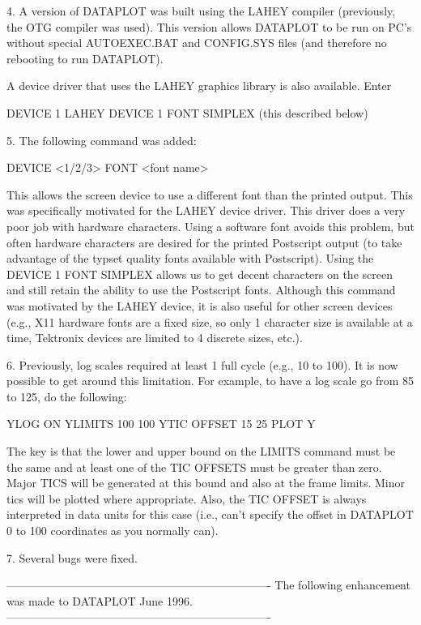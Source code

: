 { 4. A version of DATAPLOT was built using the LAHEY compiler
    (previously, the OTG compiler was used).  This version allows
    DATAPLOT to be run on PC's without special AUTOEXEC.BAT and
    CONFIG.SYS files (and therefore no rebooting to run DATAPLOT).

    A device driver that uses the LAHEY graphics library is also
    available.  Enter

        DEVICE 1 LAHEY
        DEVICE 1 FONT SIMPLEX    (this described below)

 5. The following command was added:

        DEVICE <1/2/3> FONT <font name>

    This allows the screen device to use a different font than the
    printed output.  This was specifically motivated for the LAHEY
    device driver.  This driver does a very poor job with hardware
    characters.  Using a software font avoids this problem, but
    often hardware characters are desired for the printed Postscript
    output (to take advantage of the typset quality fonts available
    with Postscript).  Using the DEVICE 1 FONT SIMPLEX allows us
    to get decent characters on the screen and still retain the
    ability to use the Postscript fonts.  Although this command
    was motivated by the LAHEY device, it is also useful for other
    screen devices (e.g., X11 hardware fonts are a fixed size, so
    only 1 character size is available at a time, Tektronix devices
    are limited to 4 discrete sizes, etc.).

 6. Previously, log scales required at least 1 full cycle (e.g.,
    10 to 100).  It is now possible to get around this limitation.
    For example, to have a log scale go from 85 to 125, do the
    following:

        YLOG ON
        YLIMITS 100 100
        YTIC OFFSET 15 25
        PLOT Y

    The key is that the lower and upper bound on the LIMITS command
    must be the same and at least one of the TIC OFFSETS must be
    greater than zero.  Major TICS will be generated at this bound
    and also at the frame limits.  Minor tics will be plotted
    where appropriate.  Also, the TIC OFFSET is always interpreted
    in data units for this case (i.e., can't specify the offset
    in DATAPLOT 0 to 100 coordinates as you normally can).

 7. Several bugs were fixed.

----------------------------------------------------------------------
The following enhancement was made to DATAPLOT June              1996.
----------------------------------------------------------------------

}
